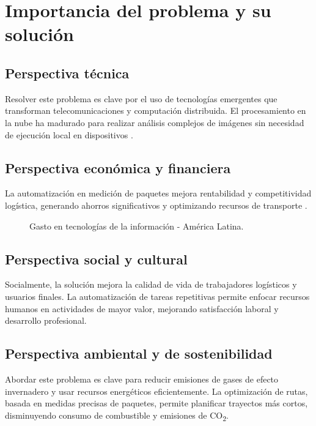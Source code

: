 \section{Importancia del problema y su solución}

\subsection{Perspectiva técnica}

Resolver este problema es clave por el uso de tecnologías emergentes que transforman telecomunicaciones y computación distribuida. El procesamiento en la nube ha madurado para realizar análisis complejos de imágenes sin necesidad de ejecución local en dispositivos \cite{Xu2012,Wang2012}.

\subsection{Perspectiva económica y financiera}

La automatización en medición de paquetes mejora rentabilidad y competitividad logística, generando ahorros significativos y optimizando recursos de transporte \cite{Krysiska2024}.

\begin{figure}[H]
    \centering
    \caption{Gasto en tecnologías de la información - América Latina.}
    \label{fig:gastos_tecnologia}
\end{figure}

\subsection{Perspectiva social y cultural}

Socialmente, la solución mejora la calidad de vida de trabajadores logísticos y usuarios finales. La automatización de tareas repetitivas permite enfocar recursos humanos en actividades de mayor valor, mejorando satisfacción laboral y desarrollo profesional.

\subsection{Perspectiva ambiental y de sostenibilidad}
Abordar este problema es clave para reducir emisiones de gases de efecto invernadero y usar recursos energéticos eficientemente. La optimización de rutas, basada en medidas precisas de paquetes, permite planificar trayectos más cortos, disminuyendo consumo de combustible y emisiones de CO\textsubscript{2}.


